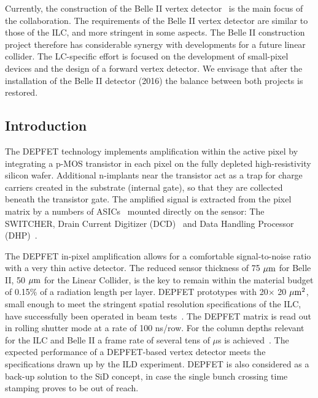 Currently, the construction of the Belle II vertex detector~\cite{Abe:2010gxa} is the main focus of the collaboration. The requirements of the Belle II vertex detector are similar to those of the ILC, and more stringent in some aspects. The Belle II construction project therefore has considerable synergy with developments for a future linear collider. The LC-specific effort is focused on the development of small-pixel devices and the design of a forward vertex detector. We envisage that after the installation of the Belle II detector (2016) the balance between both projects is restored.



\subsection{Introduction}
The DEPFET technology implements amplification within the active pixel by integrating a p-MOS transistor in each pixel on the fully depleted high-resistivity silicon wafer. Additional n-implants near the transistor act as a trap for charge carriers created in the substrate (internal gate), so that they are collected beneath the transistor gate. The amplified signal is extracted from the pixel matrix by a numbers of ASICs~\cite{Kishishita:2014maa,Krueger2010337} mounted directly on the sensor: The SWITCHER, Drain Current Digitizer (DCD)~\cite{1748-0221-6-01-C01085,5446501} and Data Handling Processor (DHP)~\cite{1748-0221-7-01-C01069}.



The DEPFET in-pixel amplification allows for a comfortable signal-to-noise ratio with a very thin active detector. The reduced sensor thickness of 75 $\mu\mathrm{m}$ for Belle II, 50 $\mu\mathrm{m}$ for the Linear Collider, is the key to remain within the material budget of 0.15\% of a radiation length per layer. DEPFET prototypes with 20$\times$ 20 $\mu\mathrm{m}^2$, small enough to meet the stringent spatial resolution specifications of the ILC, have successfully been operated in beam tests~\cite{Andricek:2011zza,Velthuis:2008zza}. The DEPFET matrix is read out in rolling shutter mode at a rate of 100 ns/row. For the column depths relevant for the ILC and Belle II a frame rate of several tens of $\mu$s is achieved~\cite{6484214}. The expected performance of a DEPFET-based vertex detector meets the specifications drawn up by the ILD experiment. DEPFET is also considered as a back-up solution to the SiD concept, in case the single bunch crossing time stamping proves to be out of reach.



